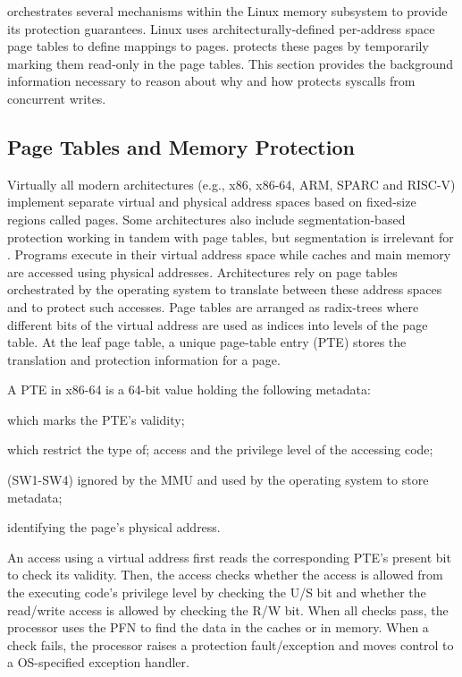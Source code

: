 \documentclass[letterpaper,twocolumn,10pt, anonymous]{article}
\begin{document}
\tiktok orchestrates several mechanisms within the Linux memory subsystem 
to provide its protection guarantees.
Linux uses architecturally-defined per-address space page tables to define
mappings to pages.
\tiktok protects these pages by temporarily marking them read-only in the 
page tables.
This section provides the background information necessary to reason about 
why and how \tiktok protects syscalls from concurrent writes.


\subsection{Page Tables and Memory Protection}

Virtually all modern architectures (e.g., x86, x86-64, ARM, SPARC and 
RISC-V) implement separate virtual and physical
address spaces based on fixed-size regions called pages.
%
Some architectures also include segmentation-based protection 
working in tandem with page tables, but segmentation is irrelevant for \tiktok.
%
Programs execute in their virtual address space while caches and main memory
are accessed using physical addresses.
Architectures rely on page tables orchestrated by the operating system 
to translate between these address spaces and to protect such accesses.
Page tables are arranged as radix-trees where different bits of the 
virtual address are used as indices into levels of the page table.
At the leaf page table, a unique page-table entry (PTE) stores the 
translation and protection information for a page.

A PTE in x86-64 is a 64-bit value holding the following metadata:
\begin{description}[noitemsep]
  \item[Present bit (P)] which marks the PTE's validity;
  \item[Protection bits (NX, R/W, U/S)] which restrict the type of;
        access and the privilege level of the accessing code;
  \item[Software-usable bits] (SW1-SW4) ignored by the MMU and used by the 
        operating system to store metadata;
  \item[Page Frame Number (PFN)] identifying the page's physical address.
\end{description}

An access using a virtual address first reads the corresponding PTE's 
present bit to check its validity. 
Then, the access checks whether the access is allowed from the executing
code's privilege level by checking the U/S bit and whether the 
read/write access is allowed by checking the R/W bit.
When all checks pass, the processor uses the PFN to find the data in 
the caches or in memory.
When a check fails, the processor raises a protection fault/exception and
moves control to a OS-specified exception handler.
\end{document}
